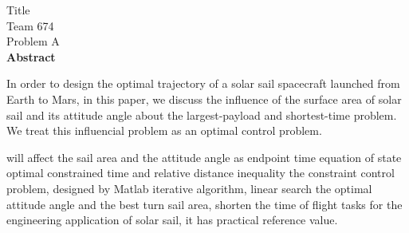 \documentclass[UTF8,a4paper,12pt,twoside]{article}
\begin{document}
 

\begin{titlepage}
	\vspace*{20mm}
	\begin{center}
		{ Title } \\[10mm]
		{ Team 674 } \\[5mm] %
		{ Problem A } \\[6mm] %
		{\bfseries {} Abstract } \\[3mm]
	\end{center}
	In order to design the optimal trajectory of a solar sail spacecraft launched from Earth to Mars, in this paper, we discuss the influence of the surface area of solar sail and its attitude angle about the largest-payload and shortest-time problem. We treat this influencial problem as an optimal control problem.

will affect the sail area and the attitude angle as endpoint time equation of state optimal constrained time and relative distance inequality the constraint control problem, designed by Matlab iterative algorithm, linear search the optimal attitude angle and the best turn sail area, shorten the time of flight tasks for the engineering application of solar sail, it has practical reference value. 
\end{titlepage}

\tableofcontents %

\newpage
\begin{spacing}{1.5} %






\newpage


\newpage
%

\end{spacing}
\end{document}
